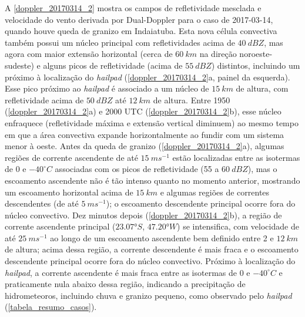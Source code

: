 A \autoref{doppler_20170314_2} mostra os campos de refletividade mesclada e velocidade do vento derivada por Dual-Doppler para o caso de 2017-03-14, quando houve queda de granizo em Indaiatuba. Esta nova célula convectiva também possui um núcleo principal com refletividades acima de $40\:dBZ$, mas agora com maior extensão horizontal (cerca de $60\:km$ na direção noroeste-sudeste) e alguns picos de refletividade (acima de $55\:dBZ$) distintos, incluindo um próximo à localização do \textit{hailpad} (\autoref{doppler_20170314_2}a, painel da esquerda). Esse pico próximo ao \textit{hailpad} é associado a um núcleo de $15\:km$ de altura, com refletividade acima de $50\:dBZ$ até $12\:km$ de altura. Entre 1950 (\autoref{doppler_20170314_2}a) e 2000 UTC (\autoref{doppler_20170314_2}b), esse núcleo enfraquece (refletividade máxima e extensão vertical diminuem) ao mesmo tempo em que a área convectiva expande horizontalmente ao fundir com um sistema menor à oeste. Antes da queda de granizo (\autoref{doppler_20170314_2}a), algumas regiões de corrente ascendente de até $15\:ms^{-1}$ estão localizadas entre as isotermas de 0 e $-40^{\circ}C$ associadas com os picos de refletividade (55 a $60\:dBZ$), mas o escoamento ascendente não é tão intenso quanto no momento anterior, mostrando um escoamento horizontal acima de $15\:km$ e algumas regiões de correntes descendentes (de até $5\:ms^{-1}$); o escoamento descendente principal ocorre fora do núcleo convectivo. Dez minutos depois (\autoref{doppler_20170314_2}b), a região de corrente ascendente principal ($\ang{23.07}S$, $\ang{47.20}W$) se intensifica, com velocidade de até $25\:ms^{-1}$ ao longo de um escoamento ascendente bem definido entre 2 e $12\:km$ de altura; acima dessa região, a corrente descendente é mais fraca e o escoamento descendente principal ocorre fora do núcleo convectivo. Próximo à localização do \textit{hailpad}, a corrente ascendente é mais fraca entre as isotermas de 0 e $-40^{\circ}C$ e praticamente nula abaixo dessa região, indicando a precipitação de hidrometeoros, incluindo chuva e granizo pequeno, como observado pelo \textit{hailpad} (\autoref{tabela_resumo_casos}).


